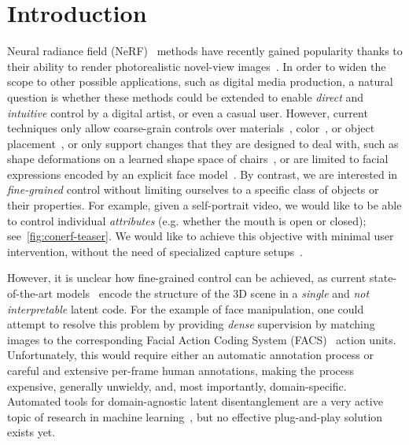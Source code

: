 \section{Introduction}
  \label{sec:conerf-intro}
  Neural radiance field (NeRF)~\cite{mildenhall2020nerf} methods have recently
  gained popularity thanks to their ability to render photorealistic
  novel-view images~\cite{martin2021nerfw,
  park2020deformable,park2021hypernerf,zhang2020nerf++}.
  In order to widen the scope to other possible applications, such as digital
  media production, a natural question is whether these methods could be
  extended to enable \textit{direct} and \textit{intuitive} control by a
  digital artist, or even a casual user.
  However, current techniques only allow coarse-grain controls over
  materials~\cite{zhang2021nerfactor}, color~\cite{jang2021codenerf}, or
  object placement~\cite{yang2021learning}, or only support changes that they
  are designed to deal with, such as shape deformations on a learned shape
  space of chairs~\cite{liu2021editing}, or are limited to facial expressions
  encoded by an explicit face model~\cite{gafni2021dynamic}.
  By contrast, we are interested in \textit{fine-grained} control without
  limiting ourselves to a specific class of objects or their properties.
  For example, given a self-portrait video, we would like to be able to
  control individual \textit{attributes} (e.g. whether the mouth is open or
  closed); see~\cref{fig:conerf-teaser}.
  We would like to achieve this objective with minimal user intervention,
  without the need of specialized capture setups~\cite{liu2021neural}.

  However, it is unclear how fine-grained control can be achieved, as current
  state-of-the-art models~\cite{park2021hypernerf} encode the structure of the
  3D scene in a \textit{single} and \textit{not interpretable} latent code.
  For the example of face manipulation, one could attempt to resolve this
  problem by providing \textit{dense} supervision by matching images to the
  corresponding Facial Action Coding System (FACS)~\cite{facs} action units.
  Unfortunately, this would require either an automatic annotation process or
  careful and extensive per-frame human annotations, making the process
  expensive, generally unwieldy, and, most importantly, domain-specific.
  Automated tools for domain-agnostic latent disentanglement are a very active
  topic of research in machine learning~\cite{higgins2016beta,
  higgins2018towards, chen2016infogan}, but no effective plug-and-play
  solution exists yet.

